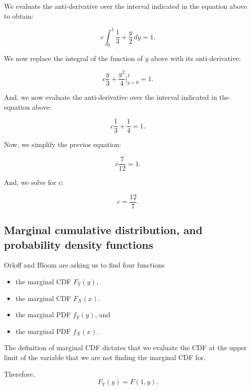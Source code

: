 \documentclass[a5paper,11pt]{article}
\begin{document}
We evaluate the anti-derivative over the
interval indicated in the equation above
to obtain:
 
\begin{equation}
c \int_0^1 \frac{1}{3} + \frac{y}{2} 
\,dy 
= 1.
\end{equation} 

We now replace the integral of the function
of $y$ above with its anti-derivative:

\begin{equation}
c \frac{y}{3} + \frac{y^2}{4} 
\bigg\rvert_{y=0}^1
= 1.
\end{equation} 

And, we now evaluate the anti-derivative
over the interval indicated in the 
equation above:

\begin{equation}
c \frac{1}{3} + \frac{1}{4} 
= 1.
\end{equation} 

Now, we simplify the previos equation:

\begin{equation}
c \frac{7}{12} = 1.
\end{equation} 

And, we solve for $c$:

\begin{equation}
c = \frac{12}{7}.
\end{equation} 

\subsection{Marginal cumulative 
distribution, and probability density 
functions}

Orloff and Bloom are asking us to find four 
functions
\begin{itemize}
\item the marginal CDF $F_{Y} \left( y
  \right)$,
\item the marginal CDF $F_{X} \left( x
  \right)$.
\item the marginal PDF $f_{Y} \left( y
  \right)$, and
\item the marginal PDF $f_{X} \left( x
  \right)$.
\end{itemize}

The definition of marginal CDF dictates
that we evaluate the CDF at the upper 
limit of the variable that we are not
finding the marginal CDF for.

Therefore, 
\begin{equation}
F_{Y} \left(y \right) = F \left(1,y \right).
\end{equation}
\end{document}
